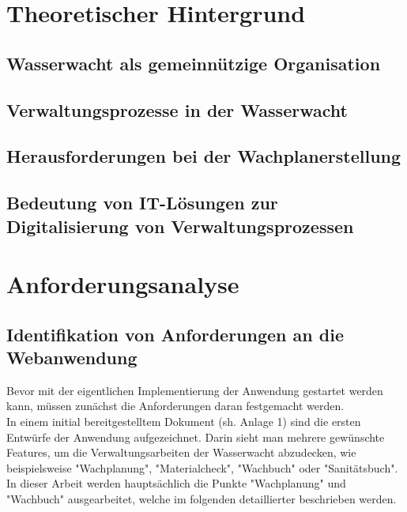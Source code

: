 \documentclass[fontsize=12pt,openright,oneside,paper=a4,BCOR=1cm]{scrbook}
\begin{document}
%
%

\chapter{Theoretischer Hintergrund}

\section{Wasserwacht als gemeinnützige Organisation}

\section{Verwaltungsprozesse in der Wasserwacht}

\section{Herausforderungen bei der Wachplanerstellung}

\section{Bedeutung von IT-Lösungen zur Digitalisierung von Verwaltungsprozessen} 


%
%

\chapter{Anforderungsanalyse}
\section{Identifikation von Anforderungen an die Webanwendung} 
Bevor mit der eigentlichen Implementierung der Anwendung gestartet werden kann, müssen zunächst die Anforderungen daran festgemacht werden. \\
In einem initial bereitgestelltem Dokument (sh. Anlage 1) sind die ersten Entwürfe der Anwendung aufgezeichnet. Darin sieht man mehrere gewünschte Features, um die Verwaltungsarbeiten der Wasserwacht abzudecken, wie beispielsweise "Wachplanung", "Materialcheck", "Wachbuch" oder "Sanitätsbuch". In dieser Arbeit werden hauptsächlich die Punkte "Wachplanung" und "Wachbuch" ausgearbeitet, welche im folgenden detaillierter beschrieben werden. \\ 
\end{document}
